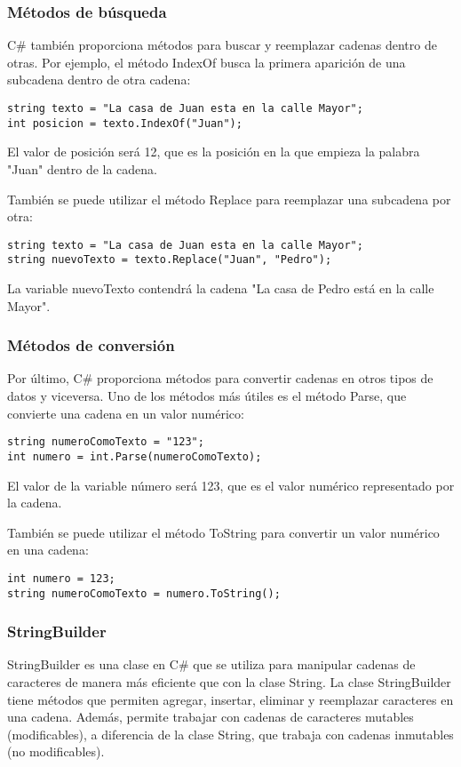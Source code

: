 \documentclass[executivepaper]{article}
\begin{document}
\subsubsection*{Métodos de búsqueda}

C\# también proporciona métodos para buscar y reemplazar cadenas dentro de otras. Por ejemplo, el método IndexOf busca la primera aparición de una subcadena dentro de otra cadena:
\begin{lstlisting}
string texto = "La casa de Juan esta en la calle Mayor";
int posicion = texto.IndexOf("Juan");    
\end{lstlisting}
El valor de posición será 12, que es la posición en la que empieza la palabra "Juan" dentro de la cadena.

También se puede utilizar el método Replace para reemplazar una subcadena por otra:
\begin{lstlisting}
string texto = "La casa de Juan esta en la calle Mayor";
string nuevoTexto = texto.Replace("Juan", "Pedro");
\end{lstlisting}
La variable nuevoTexto contendrá la cadena "La casa de Pedro está en la calle Mayor".

\subsubsection*{Métodos de conversión}

Por último, C\# proporciona métodos para convertir cadenas en otros tipos de datos y viceversa. Uno de los métodos más útiles es el método Parse, que convierte una cadena en un valor numérico:
\begin{lstlisting}
string numeroComoTexto = "123";
int numero = int.Parse(numeroComoTexto);    
\end{lstlisting}
El valor de la variable número será 123, que es el valor numérico representado por la cadena.

También se puede utilizar el método ToString para convertir un valor numérico en una cadena:

\begin{lstlisting}
int numero = 123;
string numeroComoTexto = numero.ToString();    
\end{lstlisting}

\subsubsection*{StringBuilder}

StringBuilder es una clase en C\# que se utiliza para manipular cadenas de caracteres de manera más eficiente que con la clase String. La clase StringBuilder tiene métodos que permiten agregar, insertar, eliminar y reemplazar caracteres en una cadena. Además, permite trabajar con cadenas de caracteres mutables (modificables), a diferencia de la clase String, que trabaja con cadenas inmutables (no modificables).
\end{document}
